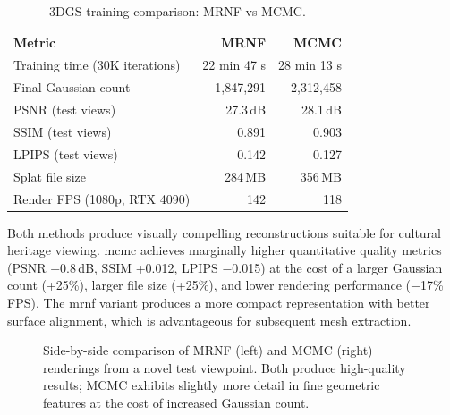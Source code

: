 \begin{table}[htbp]
  \centering
  \caption{3DGS training comparison: MRNF vs MCMC.}
  \label{tab:training-comparison}
  \begin{tabular}{@{}lrr@{}}
    \toprule
    \textbf{Metric} & \textbf{MRNF} & \textbf{MCMC} \\
    \midrule
    Training time (30K iterations)   & 22 min 47 s & 28 min 13 s \\
    Final Gaussian count             & 1,847,291   & 2,312,458 \\
    PSNR (test views)                & 27.3\,dB    & 28.1\,dB \\
    SSIM (test views)                & 0.891       & 0.903 \\
    LPIPS (test views)               & 0.142       & 0.127 \\
    Splat file size                  & 284\,MB     & 356\,MB \\
    Render FPS (1080p, RTX 4090)     & 142         & 118 \\
    \bottomrule
  \end{tabular}
\end{table}

Both methods produce visually compelling reconstructions suitable for cultural heritage viewing. \acrshort{mcmc} achieves marginally higher quantitative quality metrics (PSNR +0.8\,dB, SSIM +0.012, LPIPS $-$0.015) at the cost of a larger Gaussian count (+25\%), larger file size (+25\%), and lower rendering performance ($-$17\% FPS). The \acrshort{mrnf} variant produces a more compact representation with better surface alignment, which is advantageous for subsequent mesh extraction.

\begin{figure}[htbp]
  \centering
  \hfill
  \caption{Side-by-side comparison of MRNF (left) and MCMC (right) renderings from a novel test viewpoint. Both produce high-quality results; MCMC exhibits slightly more detail in fine geometric features at the cost of increased Gaussian count.}
  \label{fig:mrnf-vs-mcmc}
\end{figure}

